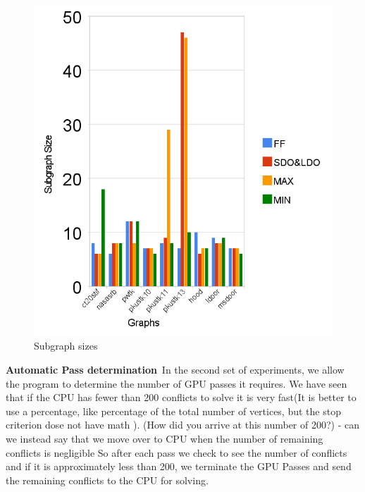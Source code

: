 \documentclass[preprint]{sigplanconf}
\begin{document}
\begin{figure}
  \centering
  \includegraphics[scale=0.5]{figures/subgraphSize.png}
  \caption{ Subgraph sizes }
\end{figure}


\textbf{Automatic Pass determination}\
In the second set of experiments, we allow the program to determine the number of GPU passes it requires. We have seen that if the CPU has fewer than 200 conflicts to solve it is very fast(It is better to use a percentage, like percentage of the total number of vertices, but the stop criterion dose not have math ). (How did you arrive at this number of 200?)  - can we instead say that we move over to CPU when the number of remaining conflicts is negligible So after each pass we check to see the number of conflicts and if it is approximately less than 200, we terminate the GPU Passes and send the remaining conflicts to the CPU for solving.\
\end{document}
